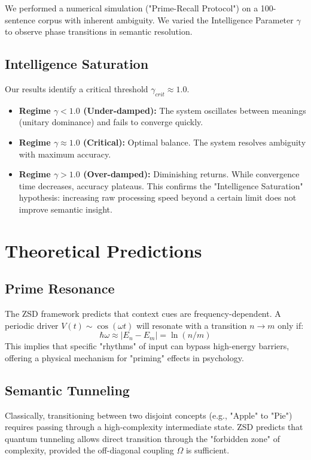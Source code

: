 \documentclass[11pt, a4paper]{article}
\begin{document}
We performed a numerical simulation ("Prime-Recall Protocol") on a 100-sentence corpus with inherent ambiguity. We varied the Intelligence Parameter $\gamma$ to observe phase transitions in semantic resolution.

\subsection{Intelligence Saturation}
Our results identify a critical threshold $\gamma_{crit} \approx 1.0$.
\begin{itemize}
    \item \textbf{Regime $\gamma < 1.0$ (Under-damped):} The system oscillates between meanings (unitary dominance) and fails to converge quickly.
    \item \textbf{Regime $\gamma \approx 1.0$ (Critical):} Optimal balance. The system resolves ambiguity with maximum accuracy.
    \item \textbf{Regime $\gamma > 1.0$ (Over-damped):} Diminishing returns. While convergence time decreases, accuracy plateaus. This confirms the "Intelligence Saturation" hypothesis: increasing raw processing speed beyond a certain limit does not improve semantic insight.
\end{itemize}

\section{Theoretical Predictions}

\subsection{Prime Resonance}
The ZSD framework predicts that context cues are frequency-dependent. A periodic driver $V(t) \sim \cos(\omega t)$ will resonate with a transition $n \to m$ only if:
\begin{equation}
    \hbar \omega \approx |E_n - E_m| = \ln(n/m)
\end{equation}
This implies that specific "rhythms" of input can bypass high-energy barriers, offering a physical mechanism for "priming" effects in psychology.

\subsection{Semantic Tunneling}
Classically, transitioning between two disjoint concepts (e.g., "Apple" to "Pie") requires passing through a high-complexity intermediate state. ZSD predicts that quantum tunneling allows direct transition through the "forbidden zone" of complexity, provided the off-diagonal coupling $\Omega$ is sufficient.
\end{document}
